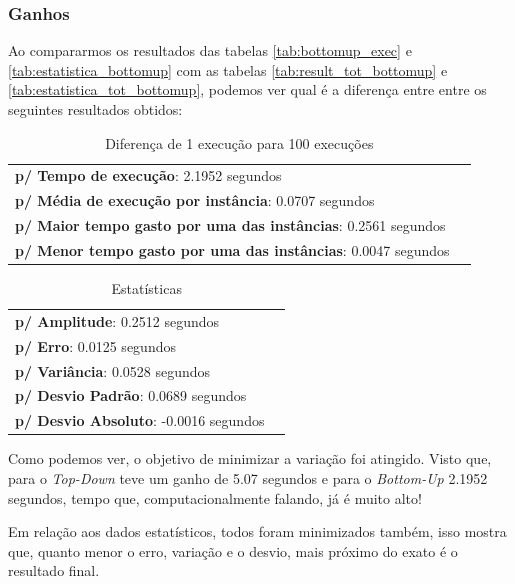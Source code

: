 \documentclass[a4paper, 12pt]{article}
\begin{document}
\subsubsection{Ganhos}

Ao compararmos os resultados das tabelas \ref{tab:bottomup_exec} e \ref{tab:estatistica_bottomup} com as 
tabelas \ref{tab:result_tot_bottomup} e \ref{tab:estatistica_tot_bottomup}, podemos ver qual é a diferença entre 
entre os seguintes resultados obtidos:
\begin{table}[!htb]
    \begin{tabular}{ll}
        {\bf p/ Tempo de execução}: 2.1952 segundos\\
        {\bf p/ Média de execução por instância}: 0.0707 segundos\\
        {\bf p/ Maior tempo gasto por uma das instâncias}: 0.2561 segundos\\
        {\bf p/ Menor tempo gasto por uma das instâncias}: 0.0047 segundos \\
    \end{tabular}
    \caption{Diferença de 1 execução para 100 execuções}
    \label{tab:diff_bottomup}
\end{table}


\begin{table}[!htb]
    \begin{tabular}{ll}
        {\bf p/ Amplitude}: 0.2512 segundos\\
        {\bf p/ Erro}: 0.0125 segundos\\
        {\bf p/ Variância}: 0.0528 segundos\\
        {\bf p/ Desvio Padrão}: 0.0689 segundos\\
        {\bf p/ Desvio Absoluto}: -0.0016 segundos
    \end{tabular}
    \caption{Estatísticas}
    \label{tab:diff_estatistica_bottomup}
\end{table}

\noindent
Como podemos ver, o objetivo de minimizar a variação foi atingido. Visto que, para o {\it Top-Down} teve um
ganho de 5.07 segundos e para o {\it Bottom-Up} 2.1952 segundos, tempo que, computacionalmente falando, já é muito alto!

Em relação aos dados estatísticos, todos foram minimizados também, isso mostra que, quanto menor o erro, variação e 
o desvio, mais próximo do exato é o resultado final.
\end{document}
